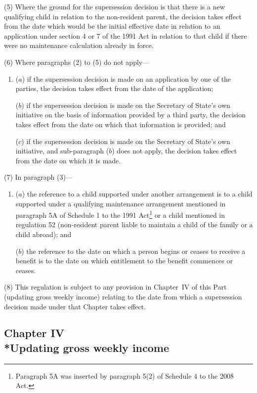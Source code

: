 \documentclass[12pt,a4paper]{article}
\begin{document}
(5) Where the ground for the supersession decision is that there is a new qualifying child in relation to the non-resident parent, the decision takes effect from the date which would be the initial effective date in relation to an application under section 4 or 7 of the 1991 Act in relation to that child if there were no maintenance calculation already in force.

(6) Where paragraphs (2) to (5) do not apply—
\begin{enumerate}\item[]
($a$) if the supersession decision is made on an application by one of the parties, the decision takes effect from the date of the application;

($b$) if the supersession decision is made on the Secretary of State’s own initiative on the basis of information provided by a third party, the decision takes effect from the date on which that information is provided; and

($c$) if the supersession decision is made on the Secretary of State’s own initiative, and sub-paragraph ($b$)  does not apply, the decision takes effect from the date on which it is made.
\end{enumerate}

(7) In paragraph (3)—
\begin{enumerate}\item[]
($a$) the reference to a child supported under another arrangement is to a child supported under a qualifying maintenance arrangement mentioned in paragraph 5A of Schedule 1 to the 1991 Act\footnote{Paragraph 5A was inserted by paragraph 5(2) of Schedule 4 to the 2008 Act.} or a child mentioned in regulation 52 (non-resident parent liable to maintain a child of the family or a child abroad); and

($b$) the reference to the date on which a person begins or ceases to receive a benefit is to the date on which entitlement to the benefit commences or ceases.
\end{enumerate}

(8) This regulation is subject to any provision in Chapter~IV of this Part (updating gross weekly income) relating to the date from which a supersession decision made under that Chapter takes effect.

\subsection[Chapter IV --- Updating gross weekly income]{Chapter IV\\*Updating gross weekly income}
\end{document}
